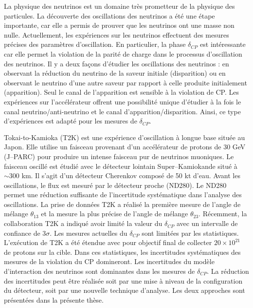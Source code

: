 \documentclass[../main.tex]{subfiles}
\begin{document}
La physique des neutrinos est un domaine très prometteur de la physique des particules. La découverte des oscillations des neutrinos a été une étape importante, car elle a permis de prouver que les neutrinos ont une masse non nulle. Actuellement, les expériences sur les neutrinos effectuent des mesures précises des paramètres d'oscillation. En particulier, la phase $\delta_{CP}$ est intéressante car elle permet la violation de la parité de charge dans le processus d'oscillation des neutrinos. Il y a deux façons d'étudier les oscillations des neutrinos : en observant la réduction du neutrino de la saveur initiale (disparition) ou en observant le neutrino d'une autre saveur par rapport à celle produite initialement (apparition). Seul le canal de l'apparition est sensible à la violation de CP. Les expériences sur l'accélérateur offrent une possibilité unique d'étudier à la fois le canal neutrino/anti-neutrino et le canal d'apparition/disparition. Ainsi, ce type d'expériences est adapté pour les mesures de $\delta_{CP}$.

Tokai-to-Kamioka (T2K) est une expérience d'oscillation à longue base située au Japon. Elle utilise un faisceau provenant d'un accélérateur de protons de 30 GeV (J--PARC) pour produire un intense faisceau pur de neutrinos muoniques. Le faisceau oscillé est étudié avec le détecteur lointain Super--Kamiokande situé à $\sim 300$ km. Il s'agit d'un détecteur Cherenkov composé de 50 kt d'eau. Avant les oscillations, le flux est mesuré par le détecteur proche (ND280). Le ND280 permet une réduction suffisante de l'incertitude systématique dans l'analyse des oscillations. La prise de données T2K a réalisé la première mesure de l'angle de mélange $\theta_{13}$ et la mesure la plus précise de l'angle de mélange $\theta_{23}$. Récemment, la collaboration T2K a indiqué avoir limité la valeur du $\delta_{CP}$ avec un intervalle de confiance de 3$\sigma$. Les mesures actuelles du $\delta_{CP}$ sont limitées par les statistiques. L'exécution de T2K a été étendue avec pour objectif final de collecter $20\times10^{21}$ de protons sur la cible. Dans ces statistiques, les incertitudes systématiques des mesures de la violation du CP domineront. Les incertitudes du modèle d'interaction des neutrinos sont dominantes dans les mesures de $\delta_{CP}$. La réduction des incertitudes peut être réalisée soit par une mise à niveau de la configuration du détecteur, soit par une nouvelle technique d'analyse. Les deux approches sont présentées dans la présente thèse.


\vspace{1cm}
\end{document}
